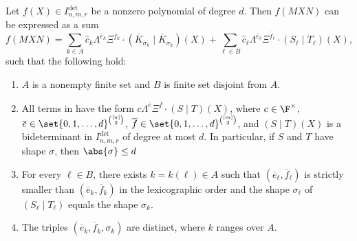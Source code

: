 \documentclass[letterpaper, 11pt]{amsart}
\begin{document}
\begin{lem}\label{lem:twosides}
Let $f(X) \in I^{\det}_{n, m, r}$ 
be a nonzero polynomial of degree $d$.
Then $f(MXN)$ can be expressed as a sum
\begin{equation}\label{eq:expansion2}
        f(MXN) = \sum_{k \in A} \widehat{c}_{k} \Lambda^{\overline{e}_k}\Xi^{\overline{f}_k}\cdot (\overline{K}_{\sigma_k}\mid \overline{K}_{\sigma_k})(X) + \sum_{\ell \in B} \widehat{c}_{\ell} \Lambda^{\overline{e}_\ell}\Xi^{\overline{f}_\ell}\cdot (S_\ell\mid T_\ell)(X),
    \end{equation}
such that the following hold:
\begin{enumerate}
    \item\label{item:expansion2_i0} $A$ is a nonempty finite set and $B$ is finite set disjoint from $A$.
    \item\label{item:expansion2_i1} All terms in  have the form $c \Lambda^{\overline{e}}\Xi^{\overline{f}}\cdot (S\mid T)(X)$, where $c\in \F^\times$, $\overline{e} \in \set{0,1,\dots,d}^{\binom{[n]}{2}}$, $\overline{f}\in \set{0,1,\dots,d}^{\binom{[m]}{2}}$,
    and $(S\mid T)(X)$ is a bideterminant in $I^{\det}_{n, m, r}$ of degree at most $d$.
    In particular, if $S$ and $T$ have shape $\sigma$, then $\abs{\sigma} \leq d$ 
    \item\label{item:expansion2_i1.5} For every $\ell\in B$, there exists $k=k(\ell)\in A$ such that $(\overline{e}_\ell, \overline{f}_\ell)$ is strictly smaller than $(\overline{e}_k,\overline{f}_k)$ in the lexicographic order and the shape $\sigma_\ell$ of $(S_\ell\mid T_\ell)$ equals the shape $\sigma_k$.
    \item\label{item:expansion2_i2} The triples $(\overline{e}_k,\overline{f}_k,\sigma_k)$ are distinct, where $k$ ranges over $A$.
\end{enumerate} 
\end{lem}
\end{document}
